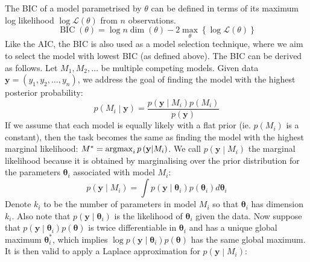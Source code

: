 \documentclass[11pt]{report} %
\begin{document}
The BIC of a model parametrised by $\theta$ can be defined in terms of its maximum log likelihood $\log\mathcal{L}\left(\theta\right)$ from $n$ observations.
\begin{equation}
\operatorname{BIC}\left(\theta\right) = \log n\dim\left(\theta\right) - 2\max_{\theta}\left\{\log\mathcal{L}\left(\theta\right)\right\}
\end{equation}
Like the AIC, the BIC is also used as a model selection technique, where we aim to select the model with lowest BIC (as defined above). The BIC can be derived as follows. Let $M_{1},  M_{2}, \dots$ be multiple competing models. Given data $\mathbf{y} = \left(y_{1}, y_{2}, \dots, y_{n}\right)$, we address the goal of finding the model with the highest posterior probability:
\begin{equation}
p\left(M_{i}\middle|\mathbf{y}\right) = \dfrac{p\left(\mathbf{y}\middle|M_{i}\right)p\left(M_{i}\right)}{p\left(\mathbf{y}\right)}
\end{equation}
If we assume that each model is equally likely with a flat prior (ie. $p\left(M_{i}\right)$ is a constant), then the task becomes the same as finding the model with the highest marginal likelihood: $M^{*} = \operatorname*{argmax}_{i}p\left(\mathbf{y}\middle|M_{i}\right)$. We call $p\left(\mathbf{y}\middle|M_{i}\right)$ the marginal likelihood because it is obtained by marginalising over the prior distribution for the parameters $\boldsymbol{\theta}_{i}$ associated with model $M_{i}$:
\begin{equation}
p\left(\mathbf{y}\middle|M_{i}\right) = \int p\left(\mathbf{y}\middle|\boldsymbol{\theta}_{i}\right) p\left(\boldsymbol{\theta}_{i}\right) d\boldsymbol{\theta}_{i}
\end{equation}
Denote $k_{i}$ to be the number of parameters in model $M_{i}$ so that $\boldsymbol{\theta}_{i}$ has dimension $k_{i}$. Also note that $p\left(\mathbf{y}\middle|\boldsymbol{\theta}_{i}\right)$ is the likelihood of $\boldsymbol{\theta}_{i}$ given the data. Now suppose that $p\left(\mathbf{y}\middle|\boldsymbol{\theta}_{i}\right) p\left(\boldsymbol{\theta}\right)$ is twice differentiable in $\boldsymbol{\theta}_{i}$ and has a unique global maximum $\boldsymbol{\theta}_{i}^{*}$, which implies $\log p\left(\mathbf{y}\middle|\boldsymbol{\theta}_{i}\right) p\left(\boldsymbol{\theta}\right)$ has the same global maximum. It is then valid to apply a Laplace approximation for $p\left(\mathbf{y}\middle|M_{i}\right)$:
\end{document}
